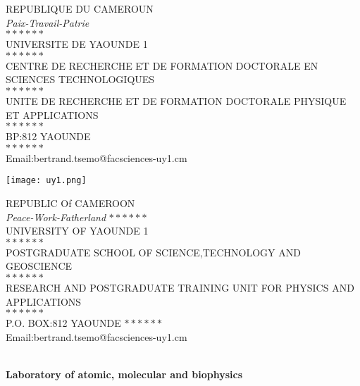 \documentclass[a4paper,12pt]{report}
\begin{document}
	\begin{titlepage}
		\begin{center}
			\begin{minipage}{6cm}
				\begin{center}
					REPUBLIQUE DU CAMEROUN\\
					\textit{Paix-Travail-Patrie}\\
					$\ast\ast\ast\ast\ast\ast$\\
				UNIVERSITE DE YAOUNDE 1\\
					$\ast\ast\ast\ast\ast\ast$\\
				CENTRE DE RECHERCHE ET DE FORMATION DOCTORALE EN SCIENCES TECHNOLOGIQUES\\
				$\ast\ast\ast\ast\ast\ast$\\
				UNITE DE RECHERCHE ET DE FORMATION DOCTORALE PHYSIQUE ET APPLICATIONS\\
					$\ast\ast\ast\ast\ast\ast$\\
					BP:812 YAOUNDE\\
					$\ast\ast\ast\ast\ast\ast$\\
					Email:bertrand.tsemo@facsciences-uy1.cm
				\end{center}
			\end{minipage}\hfill
			\begin{minipage}{2cm}
				\begin{center}
				\texttt{[image: uy1.png]}
					
				\end{center}
			\end{minipage}\hfill
			\begin{minipage}{6cm}
				\begin{center}
				REPUBLIC Of CAMEROON\\
			\textit{Peace-Work-Fatherland}
			$\ast\ast\ast\ast\ast\ast$\\
			UNIVERSITY OF YAOUNDE 1\\
			$\ast\ast\ast\ast\ast\ast$\\
			POSTGRADUATE SCHOOL OF SCIENCE,TECHNOLOGY AND GEOSCIENCE\\
		$\ast\ast\ast\ast\ast\ast$\\
	RESEARCH AND POSTGRADUATE TRAINING UNIT FOR PHYSICS AND APPLICATIONS\\
			$\ast\ast\ast\ast\ast\ast$\\
			P.O. BOX:812 YAOUNDE
			$\ast\ast\ast\ast\ast\ast$\\
			Email:bertrand.tsemo@facsciences-uy1.cm
			\end{center}	
			\end{minipage}
			\textsc{\Large }\\[1.5cm]
			{\large \bfseries Laboratory of atomic, molecular and biophysics\\[0.5cm]
				
}
\end{center}
\end{titlepage}
\end{document}
